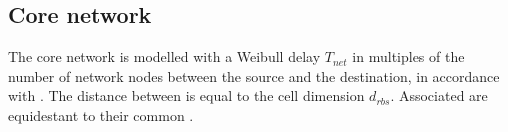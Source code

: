 \subsection{Core network}
The core network is modelled with a Weibull delay $T_{net}$ in multiples of the number of network nodes between the source and the destination, in accordance with \cite{papagiannaki2003measurement}. The distance between \rbss{} is equal to the cell dimension $d_{rbs}$. Associated \rbss{} are equidestant to their common \dc{}.